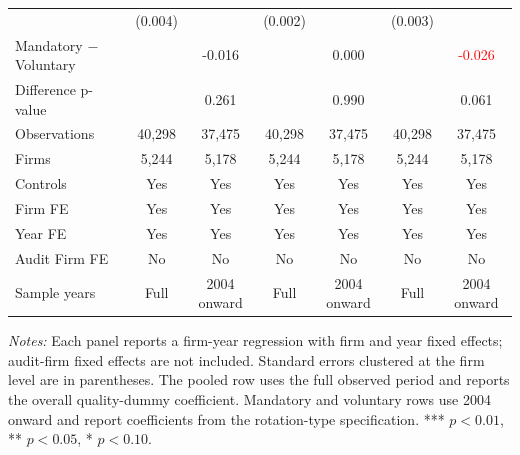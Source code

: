 \begin{table}[htbp]
\begin{threeparttable}
{\begin{tabular}{l cc cc cc}
 & (0.004) &  & (0.002) &  & (0.003) &  \\
Mandatory $-$ Voluntary &  & -0.016 &  & 0.000 &  & \textcolor{red}{-0.026\sym{*}} \\
Difference p-value &  & 0.261 &  & 0.990 &  & 0.061 \\
Observations & 40,298 & 37,475 & 40,298 & 37,475 & 40,298 & 37,475 \\
Firms & 5,244 & 5,178 & 5,244 & 5,178 & 5,244 & 5,178 \\
\midrule
Controls & Yes & Yes & Yes & Yes & Yes & Yes \\
Firm FE & Yes & Yes & Yes & Yes & Yes & Yes \\
Year FE & Yes & Yes & Yes & Yes & Yes & Yes \\
Audit Firm FE & No & No & No & No & No & No \\
Sample years & Full & 2004 onward & Full & 2004 onward & Full & 2004 onward \\
\bottomrule
\end{tabular}}
\begin{tablenotes}\footnotesize
\item \textit{Notes:} Each panel reports a firm-year regression with firm and year fixed effects; audit-firm fixed effects are not included. Standard errors clustered at the firm level are in parentheses. The pooled row uses the full observed period and reports the overall quality-dummy coefficient. Mandatory and voluntary rows use 2004 onward and report coefficients from the rotation-type specification. *** \(p<0.01\), ** \(p<0.05\), * \(p<0.10\).
\end{tablenotes}
\end{threeparttable}
\end{table}
